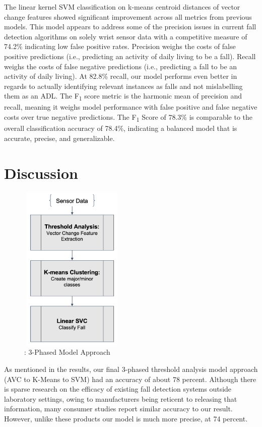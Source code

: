 \documentclass{llncs}
\begin{document}
	The linear kernel SVM classification on k-means centroid distances of vector change features showed significant improvement across all metrics from previous models. This model appears to address some of the precision issues in current fall detection algorithms on solely wrist sensor data with a competitive measure of 74.2\% indicating low false positive rates. Precision weighs the costs of false positive predictions (i.e., predicting an activity of daily living to be a fall). Recall weighs the costs of false negative predictions (i.e., predicting a fall to be an activity of daily living). At 82.8\% recall, our model performs even better in regards to actually identifying relevant instances as falls and not mislabelling them as an ADL. The F\textsubscript{1} score metric is the harmonic mean of precision and recall, meaning it weighs model performance with false positive and false negative costs over true negative predictions. The F\textsubscript{1} Score of 78.3\% is comparable to the overall classification accuracy of 78.4\%, indicating a balanced model that is accurate, precise, and generalizable. 

\section{Discussion}

\begin{figure}
	\centering
	\includegraphics[width=5cm, height=8cm]{images/ClassificationPipeline.png} 
	\caption{: 3-Phased Model Approach}
	\label{Figure 5: Threshold Analysis Classification Pipeline}
\end{figure}
As mentioned in the results, our final 3-phased threshold analysis model approach (AVC to K-Means to SVM) had an accuracy of about 78 percent. Although there is sparse research on the efficacy of existing fall detection systems outside laboratory settings, owing to manufacturers being reticent to releasing that information, many consumer studies report similar accuracy to our result. However, unlike these products our model is much more precise, at 74 percent.%
\end{document}
